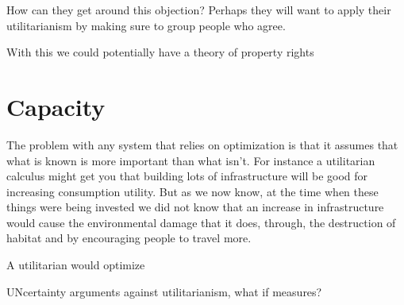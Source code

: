 \documentclass[12pt]{report}
\numberwithin{equation}{section}
\begin{document}
How can they get around this objection? Perhaps they will want to apply their utilitarianism by making sure to group people who agree. 

With this we could potentially have a theory of property rights

\section{Capacity}


The problem with any system that relies on optimization is that it assumes that what is known is more important than what isn't. For instance a utilitarian calculus might get you that building lots of infrastructure will be good for increasing consumption utility. But as we now know, at the time when these things were being invested we did not know that an increase in infrastructure would cause the environmental damage that it does, through, the destruction of habitat and by encouraging people to travel more. 

A utilitarian would optimize 

UNcertainty arguments against utilitarianism, what if measures? 






\end{document}
